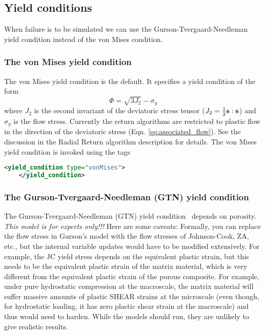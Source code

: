 \subsection{Yield conditions}
When failure is to be simulated we can use the
Gurson-Tvergaard-Needleman yield condition instead of the von Mises
condition.

  \subsubsection{The von Mises yield condition}
  The von Mises yield condition is the default.  It specifies a yield condition of
  the form
  \begin{equation}
    \Phi = \sqrt{3J_2} - \sigma_y
  \end{equation}
  where $J_2$ is the second invariant of the deviatoric stress tensor
  ($J_2={1\over2}\mathbf{s}:\mathbf{s}$) and $\sigma_y$ is the flow stress. Currently
  the return algorithms are restricted to plastic flow in the
  direction of the deviatoric stress
  (Eqn. \ref{eq:associated_flow}). See the discussion in the Radial
  Return algorithm description for details.  The von Mises yield
  condition is invoked using the tags
  \begin{lstlisting}[language=XML]
    <yield_condition type="vonMises">
    </yield_condition>
  \end{lstlisting}

  \subsubsection{The Gurson-Tvergaard-Needleman (GTN) yield condition}
  The Gurson-Tvergaard-Needleman (GTN) yield
  condition~\cite{Gurson1977,Tver1984} depends on porosity.  {\it This
  model is for experts only!!!}  Here are some caveats: Formally,
  you can replace the flow stress in Gurson’s model with the flow
  stresses of Johnson-Cook, ZA, etc., but the internal variable
  updates would have to be modified extensively.  For example, the JC
  yield stress depends on the equivalent plastic strain, but this
  needs to be the equivalent plastic strain of the matrix material,
  which is very different from the equivalent plastic strain of the
  porous composite. For example, under pure hydrostatic compression at
  the macroscale, the matrix material will suffer massive amounts of
  plastic SHEAR strains at the microscale (even though, for
  hydrostatic loading, it has zero plastic shear strain at the
  macroscale) and thus would need to harden. While the models should
  run, they are unlikely to give realistic results.

